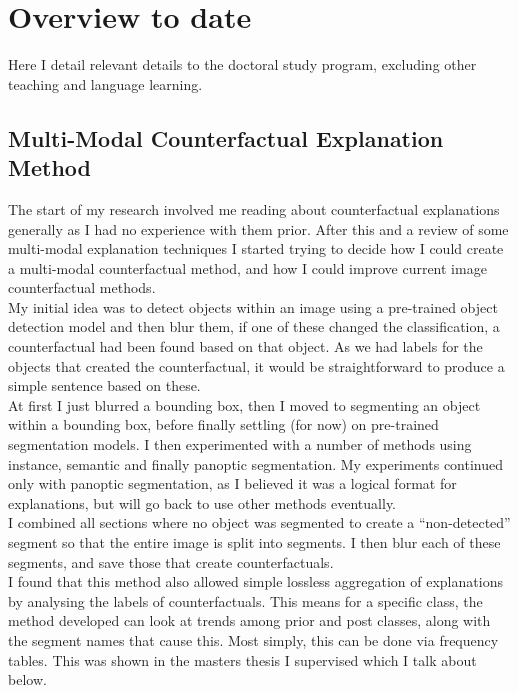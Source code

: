 \section{Overview to date}

Here I detail relevant details to the doctoral study program, excluding other teaching and language learning.

\subsection{Multi-Modal Counterfactual Explanation Method}

The start of my research involved me reading about counterfactual explanations generally as I had no experience with them prior. After this and a review of some multi-modal explanation techniques I started trying to decide how I could create a multi-modal counterfactual method, and how I could improve current image counterfactual methods. \\

My initial idea was to detect objects within an image using a pre-trained object detection model and then blur them, if one of these changed the classification, a counterfactual had been found based on that object. As we had labels for the objects that created the counterfactual, it would be straightforward to produce a simple sentence based on these. \\

At first I just blurred a bounding box, then I moved to segmenting an object within a bounding box, before finally settling (for now) on pre-trained segmentation models. I then experimented with a number of methods using instance, semantic and finally panoptic segmentation. My experiments continued only with panoptic segmentation, as I believed it was a logical format for explanations, but will go back to use other methods eventually.  \\

I combined all sections where no object was segmented to create a “non-detected” segment so that the entire image is split into segments. I then blur each of these segments, and save those that create counterfactuals. \\

I found that this method also allowed simple lossless aggregation of explanations by analysing the labels of counterfactuals. This means for a specific class, the method developed can look at trends among prior and post classes, along with the segment names that cause this. Most simply, this can be done via frequency tables. This was shown in the masters thesis I supervised which I talk about below.

